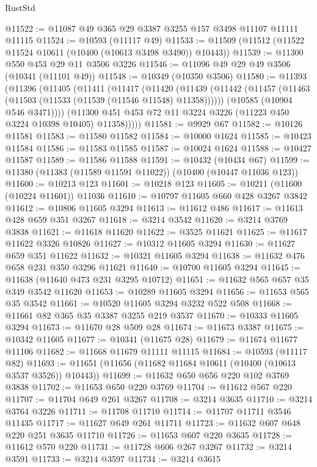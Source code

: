 \begin{lexlean}{RustStd}
\begin{coremodule}
{\begin{coremodule}
{{{{{{{{{{{{{{{{{{{{{{{{{@11522 := @11087 @49 @365 @29 @3387 @3255 @157 @3498 @11107 @11111 @11115
@11524 := @10593 (@11117 @49)
@11533 := @11509 (@11512 (@11522 @11524 @10611 (@10400 (@10613 @3498 @3490)) @10443))
@11539 := @11300 @550 @453 @29 @11 @3506 @3226
@11546 := @11096 @49 @29 @49 @3506 (@10341 (@11101 @49))
@11548 := @10349 (@10350 @3506)
@11580 := @11393
    (@11396
      (@11405
        (@11411
          (@11417
            (@11420
              (@11439
                (@11442 (@11457 (@11463 (@11503 (@11533 (@11539 (@11546 @11548) @11358))))))
                (@10585 (@10904 @546 @3471))))
            (@11300 @451 @453 @72 @11 @3224 @3226 (@11223 @450 @3224 @10398 @10405) @11358)))))
@11581 := @9929 @67
@11582 := @10126 @11581
@11583 := @11580 @11582
@11584 := @10000 @1624
@11585 := @10423 @11584
@11586 := @11583 @11585
@11587 := @10024 @1624
@11588 := @10427 @11587
@11589 := @11586 @11588
@11591 := @10432 (@10434 @67)
@11599 := @11380 (@11383 (@11589 @11591 @11022)) (@10400 (@10447 @11036 @123))
@11600 := @10213 @123
@11601 := @10218 @123
@11605 := @10211 (@11600 (@10224 @11601)) @11036
@11610 := @10797 @11605 @660 @428 @3267 @3842
@11612 := @10806 @11605 @3294
@11613 := @11612 @486
@11617 := @11613 @428 @659 @351 @3267
@11618 := @3214 @3542
@11620 := @3214 @3769 @3838
@11621 := @11618 @11620
@11622 := @3525 @11621
@11625 := @11617 @11622 @3326 @10826
@11627 := @10312 @11605 @3294
@11630 := @11627 @659 @351 @11622
@11632 := @10321 @11605 @3294
@11638 := @11632 @476 @658 @231 @350 @3296 @11621
@11640 := @10700 @11605 @3294
@11645 := @11638 (@11640 @473 @231 @3295 @10712)
@11651 := @11632 @565 @657 @35 @349 @3542 @11620
@11653 := @10289 @11605 @3294
@11656 := @11653 @565 @35 @3542
@11661 := @10520 @11605 @3294 @3232 @522 @508
@11668 := @11661 @82 @365 @35 @3387 @3255 @219 @3537
@11670 := @10333 @11605 @3294
@11673 := @11670 @28 @509 @28
@11674 := @11673 @3387
@11675 := @10342 @11605
@11677 := @10341 (@11675 @28)
@11679 := @11674 @11677 @11106
@11682 := @11668 @11679 @11111 @11115
@11684 := @10593 (@11117 @82)
@11693 := @11651 (@11656 (@11682 @11684 @10611 (@10400 (@10613 @3537 @3526)) @10443))
@11699 := @11632 @650 @656 @220 @102 @3769 @3838
@11702 := @11653 @650 @220 @3769
@11704 := @11612 @567 @220
@11707 := @11704 @649 @261 @3267
@11708 := @3214 @3635
@11710 := @3214 @3764 @3226
@11711 := @11708 @11710
@11714 := @11707 @11711 @3546 @11435
@11717 := @11627 @649 @261 @11711
@11723 := @11632 @607 @648 @220 @251 @3635 @11710
@11726 := @11653 @607 @220 @3635
@11728 := @11612 @570 @220
@11731 := @11728 @606 @267 @3267
@11732 := @3214 @3591
@11733 := @3214 @3597
@11734 := @3214 @3615
}}}}}}}}}}}}}}}}}}}}}}}}}
\end{coremodule}}
\end{coremodule}
\end{lexlean}
